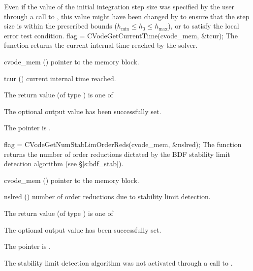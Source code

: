 {
  Even if the value of the initial integration step size was specified
  by the user through a call to , this value might have 
  been changed by {\cvodes} to ensure that the step size is within the 
  prescribed bounds ($h_{\min} \le h_0 \le h_{\max}$), or to satisfy the
  local error test condition.
}
{
  flag = CVodeGetCurrentTime(cvode\_mem, \&tcur);
}
{
  The function  returns the
  current internal time reached by the solver.
}
{
  \begin{args}
  \item[cvode\_mem] ()
    pointer to the {\cvodes} memory block.
  \item[tcur] ()
    current internal time reached.
  \end{args}
}
{
  The return value  (of type ) is one of
  \begin{args}
  \item[\Id{CV\_SUCCESS}] 
    The optional output value has been successfully set.
  \item[\Id{CV\_MEM\_NULL}]
    The  pointer is .
  \end{args}
}
{}
{
  flag = CVodeGetNumStabLimOrderReds(cvode\_mem, \&nslred);
}
{
  The function  returns the
  number of order reductions dictated by the BDF stability limit 
  detection algorithm (see \S\ref{s:bdf_stab}).
}
{
  \begin{args}
  \item[cvode\_mem] ()
    pointer to the {\cvodes} memory block.
  \item[nslred] ()
    number of order reductions due to stability limit detection.
  \end{args}
}
{
  The return value  (of type ) is one of
  \begin{args}[CV\_NO\_SLDET]
  \item[\Id{CV\_SUCCESS}] 
    The optional output value has been successfully set.
  \item[\Id{CV\_MEM\_NULL}]
    The  pointer is .
  \item[\Id{CV\_NO\_SLDET}]
    The stability limit detection algorithm was not activated 
    through a call to .
  \end{args}
}
{}
